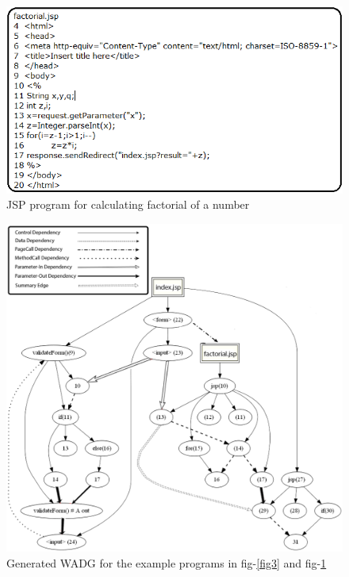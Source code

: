 \documentclass[11pt]{article}   %
\begin{document}
\begin{figure}
\begin{center}
\includegraphics[scale=1]{factorial_l.png}
\caption{JSP program for calculating factorial of a number}
\label{fig4}
\end{center}
\end{figure}


\begin{figure}
\begin{center}
\includegraphics[scale=.5]{sdg_ll.png}
\caption{Generated WADG for the example programs in fig-\ref{fig3} and fig-\ref{fig4} }
\label{fig5}
\end{center}
\end{figure}
\end{document}
